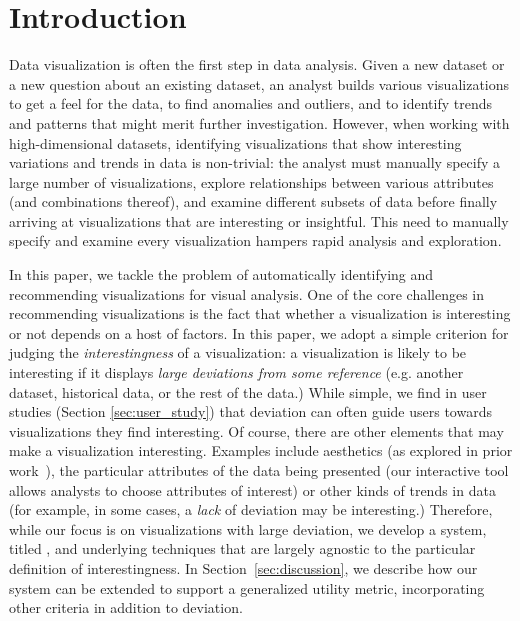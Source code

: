 
\section{Introduction}
\label{sec:introduction}
Data visualization is often the first step in data analysis.
Given a new dataset or a new question about an existing dataset, an analyst builds
various visualizations to get a feel for the data, to find anomalies and outliers, 
and to identify trends and patterns that might merit further investigation.
However, when working with high-dimensional datasets, identifying visualizations that
show interesting variations and trends in data is non-trivial:
the analyst must manually specify a large number of visualizations, explore relationships between various
attributes (and combinations thereof), and examine different subsets of data before finally 
arriving at visualizations that are interesting or insightful.
This need to manually specify and examine every visualization hampers rapid analysis 
and exploration.


In this paper, we tackle the problem of automatically 
identifying and recommending 
visualizations for visual analysis.  
One of the core challenges in recommending visualizations is the fact that 
whether a visualization is interesting or not
depends on a host of factors.
In this paper, we adopt a simple criterion for judging the {\em interestingness} of a visualization: 
a visualization is likely to be interesting if it displays 
{\em large deviations from some
reference} (e.g. another dataset, historical data, or the rest of the data.)
While simple, we find in user studies (Section \ref{sec:user_study}) 
that deviation can often guide users towards visualizations they find interesting.
Of course, there are other elements that may make a visualization interesting.
Examples include aesthetics (as explored in prior work~\cite{polaris,Mackinlay:1986:ADG:22949.22950}), 
the particular attributes of the data being presented 
(our interactive tool allows analysts to choose attributes of interest) 
or other kinds of trends in
data (for example, in some cases, a {\it lack} of deviation may be interesting.)  
Therefore, while our focus is on visualizations with large deviation, 
we develop a system, titled \SeeDB, 
and underlying techniques that are largely agnostic to the
particular definition of interestingness.
In Section~\ref{sec:discussion}, we describe how our system can be
extended to support a generalized utility metric, incorporating
other criteria in addition to deviation. 

